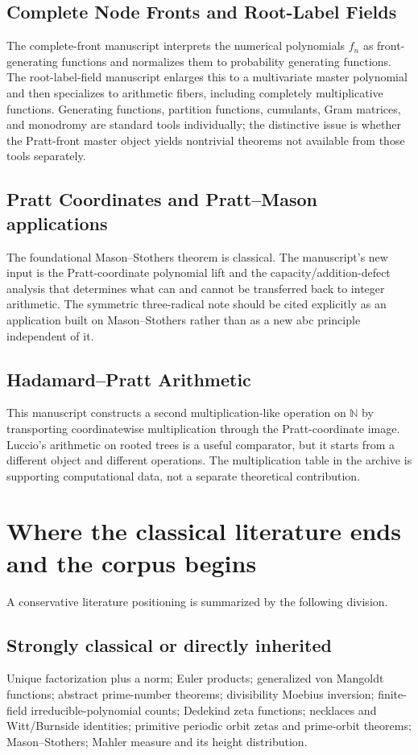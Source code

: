 \documentclass[11pt]{article}
\newcommand{\NN}{\mathbb N}
\begin{document}
\subsection{Complete Node Fronts and Root-Label Fields}
The complete-front manuscript interprets the numerical polynomials $f_n$ as front-generating functions and normalizes them to probability generating functions. The root-label-field manuscript enlarges this to a multivariate master polynomial and then specializes to arithmetic fibers, including completely multiplicative functions. Generating functions, partition functions, cumulants, Gram matrices, and monodromy are standard tools individually; the distinctive issue is whether the Pratt-front master object yields nontrivial theorems not available from those tools separately.

\subsection{Pratt Coordinates and Pratt--Mason applications}
The foundational Mason--Stothers theorem is classical. The manuscript's new input is the Pratt-coordinate polynomial lift and the capacity/addition-defect analysis that determines what can and cannot be transferred back to integer arithmetic. The symmetric three-radical note should be cited explicitly as an application built on Mason--Stothers rather than as a new abc principle independent of it.

\subsection{Hadamard--Pratt Arithmetic}
This manuscript constructs a second multiplication-like operation on $\NN$ by transporting coordinatewise multiplication through the Pratt-coordinate image. Luccio's arithmetic on rooted trees is a useful comparator, but it starts from a different object and different operations. The multiplication table in the archive is supporting computational data, not a separate theoretical contribution.

\section{Where the classical literature ends and the corpus begins}
A conservative literature positioning is summarized by the following division.

\subsection{Strongly classical or directly inherited}
Unique factorization plus a norm; Euler products; generalized von Mangoldt functions; abstract prime-number theorems; divisibility Moebius inversion; finite-field irreducible-polynomial counts; Dedekind zeta functions; necklaces and Witt/Burnside identities; primitive periodic orbit zetas and prime-orbit theorems; Mason--Stothers; Mahler measure and its height distribution.
\end{document}
